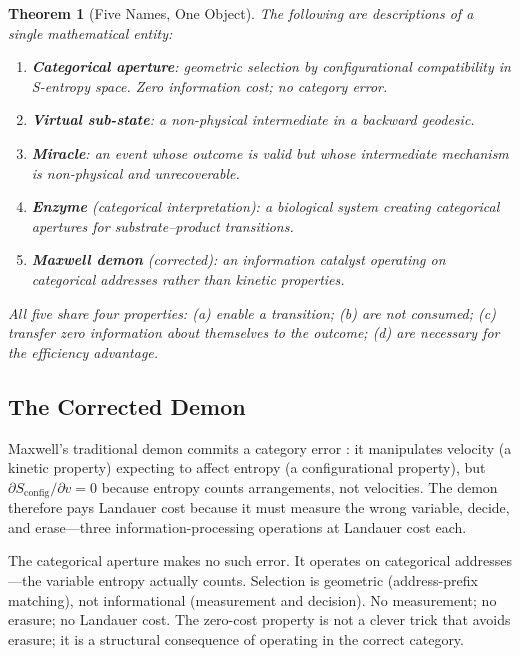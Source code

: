 \documentclass[twocolumn,11pt,a4paper]{article}
\newtheorem{theorem}{Theorem}[section]
\begin{document}
\begin{theorem}[Five Names, One Object]
\label{thm:five_names}
The following are descriptions of a single mathematical entity:
\begin{enumerate}[leftmargin=*,itemsep=1pt]
\item \textbf{Categorical aperture}: geometric selection by configurational compatibility in S-entropy space. Zero information cost; no category error.
\item \textbf{Virtual sub-state}: a non-physical intermediate in a backward geodesic.
\item \textbf{Miracle}: an event whose outcome is valid but whose intermediate mechanism is non-physical and unrecoverable.
\item \textbf{Enzyme} (categorical interpretation): a biological system creating categorical apertures for substrate--product transitions.
\item \textbf{Maxwell demon} (corrected): an information catalyst operating on categorical addresses rather than kinetic properties.
\end{enumerate}
All five share four properties: (a) enable a transition; (b) are not consumed; (c) transfer zero information about themselves to the outcome; (d) are necessary for the efficiency advantage.
\end{theorem}

\subsection{The Corrected Demon}

Maxwell's traditional demon \cite{maxwell1871theory} commits a category error \cite{leff2014maxwell}: it manipulates velocity (a kinetic property) expecting to affect entropy (a configurational property), but $\partial S_{\text{config}}/\partial v = 0$ because entropy counts arrangements, not velocities. The demon therefore pays Landauer cost \cite{landauer1961irreversibility,bennett1982thermodynamics} because it must measure the wrong variable, decide, and erase---three information-processing operations at Landauer cost each.

The categorical aperture makes no such error. It operates on categorical addresses---the variable entropy actually counts. Selection is geometric (address-prefix matching), not informational (measurement and decision). No measurement; no erasure; no Landauer cost. The zero-cost property is not a clever trick that avoids erasure; it is a structural consequence of operating in the correct category.
\end{document}
